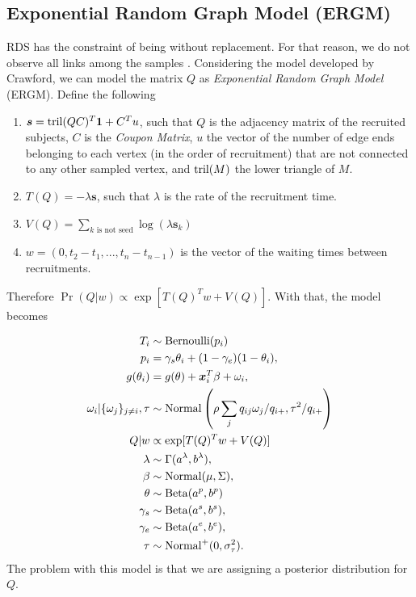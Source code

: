 \subsection{Exponential Random Graph Model (ERGM)}

RDS has the constraint of being without replacement. For that reason, we do
not observe all links among the samples \cite[]{crawford2016}. Considering the
model developed by Crawford, we can model the
matrix $Q$ as {\em Exponential Random Graph Model} (ERGM). Define the
following 

\begin{enumerate}
  \item $\boldsymbol{s} = \operatorname{tril}(QC)^T \boldsymbol{1} + C^Tu$, such that $Q$ is the
  adjacency matrix of the recruited subjects, $C$ is the {\em Coupon Matrix},
  $u$ the vector of the number of edge ends belonging to each vertex
  (in the order of recruitment) that are not connected to any other sampled
  vertex, and $\operatorname{tril}(M)$ the lower triangle of $M$. 

  \item $T(Q) = -\lambda \boldsymbol{s}$, such that $\lambda$ is the rate of
  the recruitment time. 

  \item $V(Q) = \sum_{k \text{ is not seed}} \log(\lambda \boldsymbol{s}_k)$
  
  \item $w = (0, t_2 - t_1, ..., t_n - t_{n-1})$ is the vector of the waiting times between
  recruitments.  
\end{enumerate}

Therefore $\Pr(Q|w) \propto \exp[T(Q)^Tw + V(Q)]$. With that, the model
becomes 

\begin{equation}
  \begin{aligned}
    T_i &\sim \operatorname{Bernoulli}(p_i) \\
    p_i &= \gamma_s\theta_i + (1-\gamma_e)(1 - \theta_i),  \\
    g(\theta_i) &= g(\theta) + \boldsymbol{x}_i^T\beta + \omega_i,  \\
    \omega_i|\{\omega_j\}_{j\neq i}, \tau &\sim \operatorname{Normal}\left(\rho\sum_j q_{ij}\omega_j/q_{i+}, \tau^2/q_{i+}\right) \\
    Q|w &\propto \exp[T(Q)^Tw + V(Q)] \\
    \lambda &\sim \Gamma(a^{\lambda}, b^{\lambda}), \\ 
    \beta &\sim \operatorname{Normal}(\mu, \Sigma), \\ 
    \theta &\sim \operatorname{Beta}(a^p, b^p) \\
    \gamma_s &\sim \operatorname{Beta}(a^s, b^s), \\
    \gamma_e &\sim \operatorname{Beta}(a^e, b^e), \\  
    \tau &\sim \operatorname{Normal}^+(0,\sigma^2_{\tau}).
  \end{aligned}  
\end{equation}
The problem with this model is that we are assigning a posterior distribution
for $Q$.